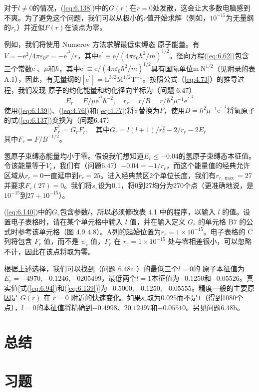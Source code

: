     对于$l\neq 0$的情况，(\ref{eq:6.138})中的$G\left(r\right)$在$r=0$处发散，这会让大多数电脑感到不爽。为了避免这个问题，我们可以从极小的$r$值开始求解（例如，$10^{-15}$为无量纲的$r_r$）并近似$F\left(r\right)$在该点为零。

    例如，我们将使用 Numerov 方法求解最低束缚态  原子能量。有$V = -\mathrm{e}^2/4\pi\varepsilon_0r = -\mathrm{e}^{\prime^2}/r$，其中$\mathrm{e}^{\prime} \equiv \mathrm{e}/\left(4\pi\varepsilon_0\hbar^2/m\right)^{1/2}$。径向方程(\ref{eq:6.62})包含三个常数$\mathrm{e}^{\prime}$、$\mu$和$\hbar$，其中$\mathrm{e}^{\prime} \equiv \mathrm{e}/\left(4\pi\varepsilon_0\hbar^2/m\right)^{1/2}$具有国际单位$\mathrm{m}\: \mathrm{N}^{1/2}$（见附录的表A.1），因此，有无量纲的$\left[\mathrm{e}^{\prime}\right] = \mathrm{L}^{3/2}\mathrm{M}^{1/2}\mathrm{T}^{-1}$。按照公式（\ref{eq:4.73}）的推导过程，我们发现  原子的约化能量和约化径向坐标为（问题 6.47）
    \begin{equation}
        E_r = E/\mu \mathrm{e}^{\prime ^4}\hbar^{-2}, \quad r_r = r/B = r/\hbar^2\mu^{-1}\mathrm{e}^{\prime ^{-2}}
        \label{eq:6.139}
    \end{equation}
    使用(\ref{eq:6.139})、(\ref{eq:4.76})和(\ref{eq:4.77})将$\psi$替换为$F$，使用$B = \hbar^2\mu^{-1}\mathrm{e}^{\prime ^{-2}}$将氢原子的式(\ref{eq:6.137})变换为（问题6.47）
    \begin{equation}
        F^{\prime\prime}_r = G_rF_r, \quad \text{其中}G_r = l\left(l+1\right)/r_r^2 - 2/r_r -2E_r
        \label{eq:6.140}
    \end{equation}
    其中$F_r = F/B^{-1/2}$。

    氢原子束缚态能量均小于零。假设我们想知道$E_r \leq -0.04$的氢原子束缚态本征值。令该能量等于$V_r$，我们有（问题6.47）$-0.04 = -1/r_r$，而这个能量值的经典允许区域从$r_r = 0$一直延申到$r_r = 25$。进入经典禁区2个单位长度，我们有$r_{r,\max} = 27$并要求$F_r\left(27\right)=0$。我们将$s_r$设为0.1，将0到27均分为270个点（更准确地说，是$10^{-15}$到$27+10^{-15}$）。

    (\ref{eq:6.140})中的$G_r$包含参数$l$，所以必须修改表 4.1 中的程序，以输入 $l$ 的值。设置电子表格时，请在某个单元格中输入 $l$ 值，并在输入定义 $G_r$ 的单元格 B7 的公式时参考该单元格（图 4.9 4.8）。A列的起始位置为$r_r = 1\times 10^{-15}$。电子表格的 C 列将包含 $F_r$ 值，而不是 $\psi_r$ 值，$F_r$ 在 $r_r = 1\times10^{-15}$ 处与零相差很小，可以忽略不计，因此在该点将取为零。

    根据上述选择，我们可以找到（问题 6.48a ）的最低三个$l=0$的  原子本征值为$E_r = -4970,-0.1246,-0205499$，最低两个$l=1$本征值为$-0.1250$和$-0.05526$。真实值[式(\ref{eq:6.94})和(\ref{eq:6.139})]为$-0.5000,-0.1250,-0.05555$。精度一般的主要原因是 $G\left(r\right)$ 在 $r=0$ 附近的快速变化。如果$s_r$取为$0.025$而不是$1$（得到1080个点），$l=0$的本征值将精确到$-0.4998$、$20.12497$和$-0.05510$。另见问题6.48b。

\section*{总结}

\section*{习题}
